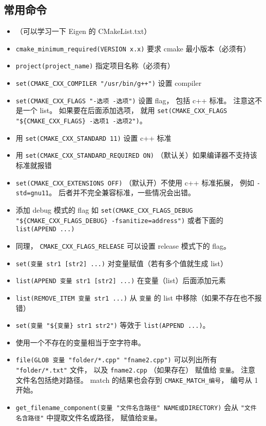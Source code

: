 \subsection{常用命令}
\begin{itemize}
\item （可以学习一下 Eigen 的 CMakeList.txt）
\item \verb`cmake_minimum_required(VERSION x.x)` 要求 cmake 最小版本（必须有）
\item \verb`project(project_name)` 指定项目名称（必须有）
\item \verb|set(CMAKE_CXX_COMPILER "/usr/bin/g++")| 设置 compiler
\item \verb|set(CMAKE_CXX_FLAGS "-选项 -选项")| 设置 flag， 包括 c++ 标准。 注意这不是一个 list。 如果要在后面添加选项， 就用 \verb|set(CMAKE_CXX_FLAGS "${CMAKE_CXX_FLAGS} -选项1 -选项2")|。
\item 用 \verb|set(CMAKE_CXX_STANDARD 11)| 设置 c++ 标准
\item 用 \verb|set(CMAKE_CXX_STANDARD_REQUIRED ON)| （默认关）如果编译器不支持该标准就报错
\item \verb|set(CMAKE_CXX_EXTENSIONS OFF)| （默认开）不使用 c++ 标准拓展， 例如 \verb|-std=gnu11|。 后者并不完全兼容标准，一些情况会出错。
\item 添加 debug 模式的 flag 如 \verb|set(CMAKE_CXX_FLAGS_DEBUG "${CMAKE_CXX_FLAGS_DEBUG} -fsanitize=address")| 或者下面的 \verb`list(APPEND ...)`
\item 同理， \verb|CMAKE_CXX_FLAGS_RELEASE| 可以设置 release 模式下的 flag。
\item \verb`set(变量 str1 [str2] ...)` 对变量赋值（若有多个值就生成 list）
\item \verb`list(APPEND 变量 str1 [str2] ...)` 在变量（list）后面添加元素
\item \verb|list(REMOVE_ITEM 变量 str1 ...)| 从 \verb|变量| 的 list 中移除（如果不存在也不报错）
\item \verb|set(变量 "${变量} str1 str2")| 等效于 \verb`list(APPEND ...)`。
\item 使用一个不存在的变量相当于空字符串。
\item \verb`file(GLOB 变量 "folder/*.cpp" "fname2.cpp")` 可以列出所有 \verb|"folder/*.txt"| 文件， 以及 \verb|fname2.cpp| （如果存在） 赋值给 \verb|变量|。 注意文件名包括绝对路径。 match 的结果也会存到 \verb|CMAKE_MATCH_编号|， 编号从 1 开始。
\item \verb|get_filename_component(变量 "文件名含路径" NAME或DIRECTORY)| 会从 \verb|"文件名含路径"| 中提取文件名或路径， 赋值给\verb|变量|。

\end{itemize}
